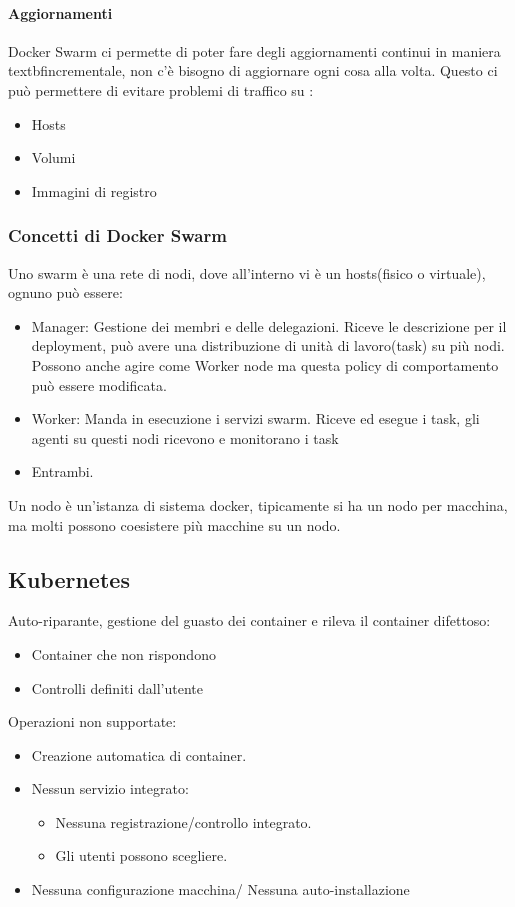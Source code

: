 \documentclass{article}
\begin{document}
		\paragraph{Aggiornamenti}
		Docker Swarm ci permette di poter fare degli aggiornamenti continui in maniera textbf{incrementale}, non c'è bisogno di aggiornare ogni cosa alla volta. Questo ci può permettere di evitare problemi di traffico su :
		\begin{itemize}
		    \item Hosts
		    \item Volumi
		    \item Immagini di registro
		\end{itemize}
		
		\subsubsection{Concetti di Docker Swarm}
		Uno swarm è una rete di nodi, dove all'interno vi è un hosts(fisico o virtuale), ognuno può essere:
		\begin{itemize}
		    \item Manager: Gestione dei membri e delle delegazioni. Riceve le descrizione per il deployment, può avere una distribuzione di unità di lavoro(task) su più nodi. Possono anche agire come Worker node ma questa policy di comportamento può essere modificata.
		    \item Worker: Manda in esecuzione i servizi swarm. Riceve ed esegue i task, gli agenti su questi nodi ricevono e monitorano i task
		    \item Entrambi.
		\end{itemize}
		Un nodo è un'istanza di sistema docker, tipicamente si ha un nodo per macchina, ma molti possono coesistere più macchine su un nodo.
		
		\subsection{Kubernetes}
		Auto-riparante, gestione del guasto dei container e rileva il container difettoso:
		\begin{itemize}
		    \item Container che non rispondono
		    \item Controlli definiti dall'utente
		\end{itemize}
		Operazioni non supportate:
		\begin{itemize}
		    \item Creazione automatica di container.
		    \item Nessun servizio integrato:
		    \begin{itemize}
		        \item Nessuna registrazione/controllo integrato.
		        \item Gli utenti possono scegliere.
		    \end{itemize}
		    \item Nessuna configurazione macchina/ Nessuna auto-installazione
		\end{itemize}
		
\end{document}
